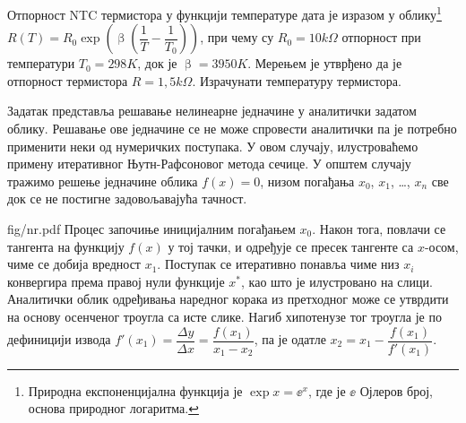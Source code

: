 \PID
Отпорност NTC термистора у функцији температуре дата је изразом у облику\footnote{Природна експоненцијална функција је
$\exp x = \ee^x$, где је $\ee$ Ојлеров број, основа природног логаритма.} 
${R(T) = R_0 \exp\left(\upbeta\left( \dfrac1T - \dfrac1{T_0} \right) \right)}$, \vspace{1mm} при чему су 
$R_0 = 10\unit{k\Omega}$ отпорност при температури ${T_0 = 298\unit{K}}$, док је 
$\upbeta = 3950\unit{K}$. Мерењем је утврђено да је отпорност термистора $R = 1,5\unit{k\Omega}$. Израчунати 
температуру термистора.

\RESENJE 

Задатак представља решавање нелинеарне једначине у аналитички задатом облику. Решавање ове једначине се не може спровести аналитички па 
је потребно применити неки од нумеричких поступака. У овом случају, илустроваћемо примену итеративног Њутн-Рафсоновог метода сечице.
У општем случају тражимо решење једначине облика $f(x) = 0$, низом погађања $x_0$, $x_1$, \ldots, $x_n$ све док се не постигне задовољавајућа
тачност. \vspace{1mm}

\begin{slikaDesno}{fig/nr.pdf}
    Процес започиње иницијалним погађањем $x_0$. Након тога, повлачи се тангента на функцију $f(x)$ у тој тачки, 
    и одређује се пресек тангенте са $x$-осом, чиме се добија вредност $x_1$. Поступак се итеративно понавља чиме 
    низ ${x_i}$ конвергира према правој нули функције $x^\ast$, као што је илустровано на слици. Аналитички облик одређивања 
    наредног корака из претходног може се утврдити на основу осенченог троугла са исте слике. Нагиб хипотенузе тог 
    троугла је по дефиницији извода $f'(x_1) = \dfrac{\Delta y}{\Delta x} = \dfrac{f(x_1)}{x_1 - x_2}$, па је одатле 
    $x_2 = x_1 - \dfrac{f(x_1)}{f'(x_1)}$. 
\end{slikaDesno}

